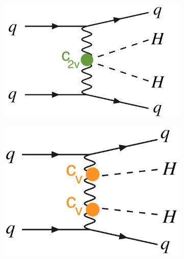 \begin{figure}[ht]
        \centering
        \begin{subfigure}[b]{0.33\textwidth}
            \centering
            \includegraphics[width=\textwidth]{MSc_Thesis/fig/vbf1.png}
            \vspace{-0.5cm}
        \end{subfigure}
        \begin{subfigure}[b]{0.3\textwidth}  
            \centering 
            \includegraphics[width=\textwidth]{MSc_Thesis/fig/vbf2.png}
            \vspace{-0.5cm}
        \end{subfigure}
        \begin{subfigure}[b]{0.35\textwidth}  
            \centering 

\end{subfigure}
\end{figure}
